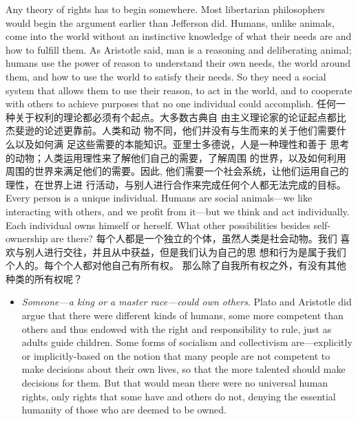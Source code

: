 \begin{paracol}{2}
Any theory of rights has to begin somewhere. Most libertarian
philosophers would begin the argument earlier than Jefferson
did. Humans, unlike animals, come into the world without an
instinctive knowledge of what their needs are and how to fulfill
them. As Aristotle said, man is a reasoning and deliberating animal; humans use the power of reason to understand their own
needs, the world around them, and how to use the world to satisfy their needs. So they need a social system that allows them
to use their reason, to act in the world, and to cooperate with
others to achieve purposes that no one individual could accomplish.
\switchcolumn
任何一种关于权利的理论都必须有个起点。大多数古典自
由主义理论家的论证起点都比杰斐逊的论述更靠前。人类和动
物不同，他们并没有与生而来的关于他们需要什么以及如何满
足这些需要的本能知识。亚里士多德说，人是一种理性和善于
思考的动物；人类运用理性来了解他们自己的需要，了解周围
的世界，以及如何利用周围的世界来满足他们的需要。因此,
他们需要一个社会系统，让他们运用自己的理性，在世界上进
行活动，与别人进行合作来完成任何个人都无法完成的目标。
\switchcolumn*
Every person is a unique individual. Humans are social animals---we like interacting with others, and we profit from it---but we think and act individually. Each individual owns himself
or herself. What other possibilities besides self-ownership are
there?
\switchcolumn
每个人都是一个独立的个体，虽然人类是社会动物。我们
喜欢与别人进行交往，并且从中获益，但是我们认为自己的思
想和行为是属于我们个人的。每个个人都对他自己有所有权。
那么除了自我所有权之外，有没有其他种类的所有权呢？
\switchcolumn*
\begin{itemize}
	\item \textit{Someone---a king or a master race---could own others}. Plato and
	Aristotle did argue that there were different kinds of humans,
	some more competent than others and thus endowed with the
	right and responsibility to rule, just as adults guide children.
	Some forms of socialism and collectivism are---explicitly or implicitly-based on the notion that many people are not competent to make decisions about their own lives, so that the more talented should make decisions for them. But that would mean
	there were no universal human rights, only rights that some
	have and others do not, denying the essential humanity of those
	who are deemed to be owned.

\end{itemize}
\end{paracol}
